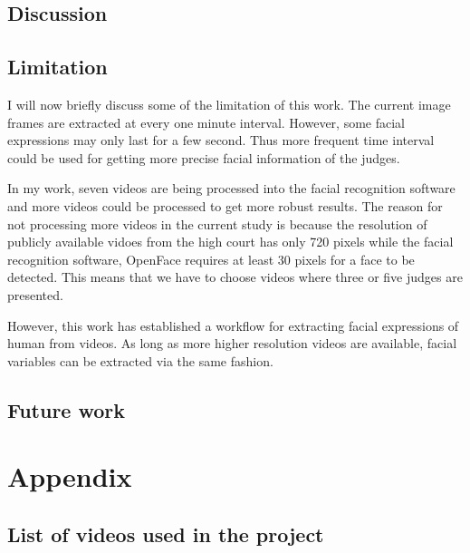 \documentclass{monashthesis}
\begin{document}
\hypertarget{discussion}{%
\section{Discussion}\label{discussion}}

\hypertarget{limitation}{%
\section{Limitation}\label{limitation}}

I will now briefly discuss some of the limitation of this work. The current image frames are extracted at every one minute interval. However, some facial expressions may only last for a few second. Thus more frequent time interval could be used for getting more precise facial information of the judges.

In my work, seven videos are being processed into the facial recognition software and more videos could be processed to get more robust results. The reason for not processing more videos in the current study is because the resolution of publicly available vidoes from the high court has only 720 pixels while the facial recognition software, OpenFace requires at least 30 pixels for a face to be detected. This means that we have to choose videos where three or five judges are presented.

However, this work has established a workflow for extracting facial expressions of human from videos. As long as more higher resolution videos are available, facial variables can be extracted via the same fashion.

\hypertarget{future-work}{%
\section{Future work}\label{future-work}}

\appendix

\hypertarget{appendix}{%
\chapter{Appendix}\label{appendix}}

\hypertarget{list-of-videos-used-in-the-project}{%
\section{List of videos used in the project}\label{list-of-videos-used-in-the-project}}
\end{document}
